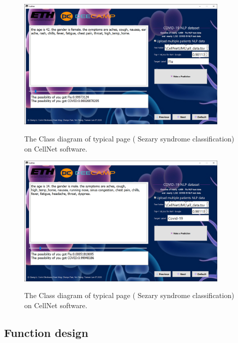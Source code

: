 \begin{figure}[t]
\begin{center}
\includegraphics[height=0.35\textheight,width=0.9\textwidth]{thesis-template-master/images/cellnet7-2page.PNG}
\label{fig:cellnet}
\end{center}
\caption{ The Class diagram of typical page ( Sezary syndrome classification) on CellNet software.}
\end{figure}


\begin{figure}[t]
\begin{center}
\includegraphics[height=0.35\textheight,width=0.9\textwidth]{thesis-template-master/images/cellnet7-3page.PNG}
\label{fig:cellnet}
\end{center}
\caption{ The Class diagram of typical page ( Sezary syndrome classification) on CellNet software. }
\end{figure}


\subsection{Function design} %
\label{sub:amet}


